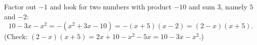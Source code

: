 Factor out $-1$ and look for two numbers with product $-10$ and sum $3$, namely $5$ and $-2$:
\[
10-3x-x^2=-(x^2+3x-10)=-(x+5)(x-2)=\boxed{(2-x)(x+5)}.
\]
(Check: $(2-x)(x+5)=2x+10-x^2-5x=10-3x-x^2$.)
